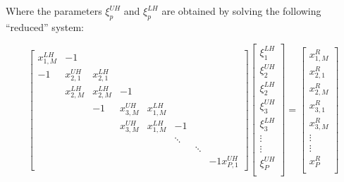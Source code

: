 \documentclass{article}
\begin{document}
    Where the parameters ${\xi}_p^{UH}$ and ${\xi}_p^{LH}$ are obtained
    by solving the following ``reduced'' system:

    \begin{equation} \label{eqn:reduced-system}
     \begin{bmatrix}
         x_{1,M}^{LH}   &   -1                                                          \\
         -1             &   x_{2,1}^{UH} &   x_{2,1}^{LH}                               \\
                        &   x_{2,M}^{LH} &   x_{2,M}^{LH}  &  -1                        \\
         &              &   -1           &   x_{3,M}^{UH}  &  x_{1,M}^{LH}              \\
         &              &   &                x_{3,M}^{UH}  &  x_{1,M}^{LH} &    -1      \\
         &              &   &            &   &             \ddots   \\
         &              &   &            &   &             &        \ddots \\
         &  &   &   &   &   &   & -1 x_{P,1}^{UH}
      \end{bmatrix}
    \begin{bmatrix}
        \xi_1^{LH} \\
        \xi_2^{UH} \\
        \xi_2^{LH} \\
        \xi_3^{UH} \\
        \xi_3^{LH} \\
        \vdots \\
        \vdots \\
        \xi_P^{UH} \\
     \end{bmatrix}
     =
     \begin{bmatrix}
         x_{1,M}^R \\
         x_{2,1}^R \\
         x_{2,M}^R \\
         x_{3,1}^R \\
         x_{3,M}^R \\
         \vdots \\
         \vdots \\
         x_P^R \\
      \end{bmatrix}
  \end{equation}
\end{document}
